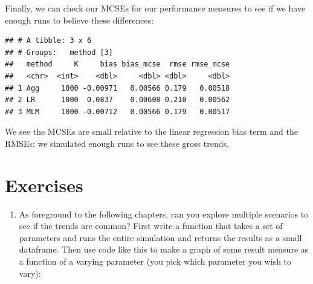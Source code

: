 \documentclass[
]{book}
\newenvironment{Shaded}{\begin{snugshade}}{\end{snugshade}}
\newcommand{\AttributeTok}[1]{\textcolor[rgb]{0.77,0.63,0.00}{#1}}
\newcommand{\FunctionTok}[1]{\textcolor[rgb]{0.00,0.00,0.00}{#1}}
\newcommand{\NormalTok}[1]{#1}
\newcommand{\OtherTok}[1]{\textcolor[rgb]{0.56,0.35,0.01}{#1}}
\newcommand{\SpecialCharTok}[1]{\textcolor[rgb]{0.00,0.00,0.00}{#1}}
\newcommand{\StringTok}[1]{\textcolor[rgb]{0.31,0.60,0.02}{#1}}
\providecommand{\tightlist}{%
  \setlength{\itemsep}{0pt}\setlength{\parskip}{0pt}}
\begin{document}
Finally, we can check our MCSEs for our performance measures to see if we have enough runs to believe these differences:

\begin{Shaded}
\end{Shaded}

\begin{verbatim}
## # A tibble: 3 x 6
## # Groups:   method [3]
##   method     K     bias bias_mcse  rmse rmse_mcse
##   <chr>  <int>    <dbl>     <dbl> <dbl>     <dbl>
## 1 Agg     1000 -0.00971   0.00566 0.179   0.00518
## 2 LR      1000  0.0837    0.00608 0.210   0.00562
## 3 MLM     1000 -0.00712   0.00566 0.179   0.00517
\end{verbatim}

We see the MCSEs are small relative to the linear regression bias term and the RMSEs: we simulated enough runs to see these gross trends.

\hypertarget{exercises-2}{%
\section{Exercises}\label{exercises-2}}

\begin{enumerate}
\def\labelenumi{\arabic{enumi}.}
\tightlist
\item
  As foreground to the following chapters, can you explore multiple scenarios to see if the trends are common? First write a function that takes a set of parameters and runs the entire simulation and returns the results as a small dataframe.
  Then use code like this to make a graph of some result measure as a function of a varying parameter (you pick which parameter you wish to vary):
\end{enumerate}
\end{document}
